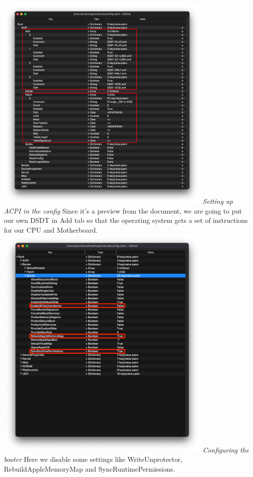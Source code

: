 \documentclass[12pt, letterpaper]{article}
\begin{document}
\includegraphics[width=0.8\textwidth]{fotos/PSP/Propertree/Acpi.png}
\break
\emph{Setting up ACPI in the config}
\hfill\break
\hfill\break
Since it's a preview from the document, we are going to put our own DSDT in Add tab so that the operating system gets a set of instructions for our CPU and Motherboard.
\hfill\break
\hfill\break
\includegraphics[width=0.8\textwidth]{fotos/PSP/Propertree/Booter.png}
\break
\emph{Configuring the booter}
\hfill\break
\hfill\break
Here we disable some settings like WriteUnprotector, RebuildAppleMemoryMap and SyncRuntimePermissions.
\end{document}
